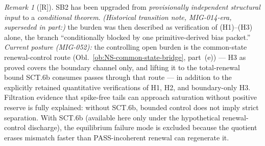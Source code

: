 \documentclass[12pt,oneside]{amsbook}
\theoremstyle{plain}
\theoremstyle{definition}
\theoremstyle{remark}
\newtheorem{remark}[theorem]{Remark}
\newcommand{\status}[1]{\textup{[#1]}}
\begin{document}
\begin{remark}[\status{R}]\label{rmk:SB2-SCT6b}
SB2 has been upgraded from \emph{provisionally independent
structural input} to a \emph{conditional theorem}.
\emph{(Historical transition note, MIG-014-era, superseded in
part:)} the burden was then described as verification of
(H1)--(H3) alone, the branch ``conditionally blocked by one
primitive-derived bias packet.'' \emph{Current posture (MIG-052):}
the controlling open burden is the common-state renewal-control
route (Obl.~\ref{ob:NS-common-state-bridge}, part~(e)) --- H3 as
proved covers the boundary channel only, and lifting it to the
total-renewal bound SCT.6b consumes passes through that route ---
in addition to the explicitly retained quantitative verifications
of H1, H2, and boundary-only H3. Filtration evidence that
spike-free tails can approach saturation without positive reserve
is fully explained: without SCT.6b, bounded control does not imply
strict separation. With SCT.6b (available here only under the
hypothetical renewal-control discharge), the equilibrium failure
mode is excluded because the quotient erases mismatch faster than
PASS-incoherent renewal can regenerate it.
\end{remark}
\end{document}
